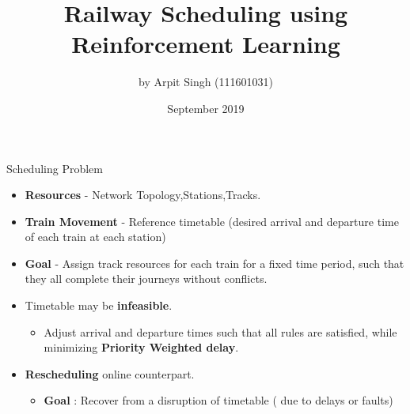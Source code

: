 \documentclass{beamer}
\title{Railway Scheduling using Reinforcement Learning}
\author{by Arpit Singh (111601031) }
\date{September 2019}
\begin{document}
\maketitle


\begin{frame}{Scheduling Problem}
\begin{itemize}
\item \textbf{Resources} - Network Topology,Stations,Tracks.
\item \textbf{Train Movement} - Reference timetable (desired arrival and departure time of each train at each station)
\item \textbf{Goal} - Assign track resources for each train for a fixed time period, such that they all complete their journeys without conflicts.
\item Timetable may be \textbf{infeasible}.
\begin{itemize}
    \item Adjust arrival and departure times such that all rules are satisfied, while minimizing \textbf{Priority Weighted delay}.
\end{itemize}

\item \textbf{Rescheduling} online counterpart.
\begin{itemize}
    \item \textbf{Goal} : Recover from a disruption of timetable ( due to delays or faults)
\end{itemize}
 
\end{itemize}
\end{frame}
\end{document}
